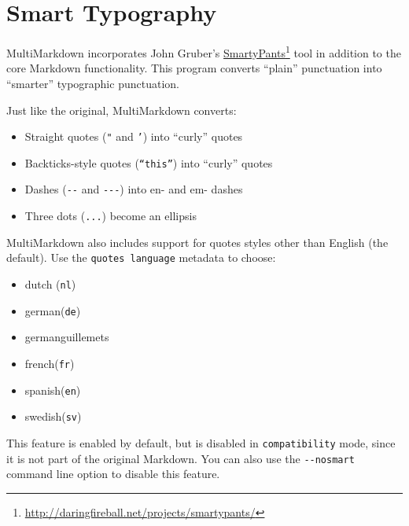 \section{Smart Typography }
\label{smarttypography}

MultiMarkdown incorporates John Gruber's \href{http://daringfireball.net/projects/smartypants/}{SmartyPants}\footnote{\href{http://daringfireball.net/projects/smartypants/}{http:\slash \slash daringfireball.net\slash projects\slash smartypants\slash }} tool in addition to the core Markdown functionality. This program converts ``plain'' punctuation into ``smarter'' typographic punctuation.

Just like the original, MultiMarkdown converts:

\begin{itemize}
\item Straight quotes (\texttt{"} and \texttt{'}) into ``curly'' quotes

\item Backticks-style quotes (\texttt{``this''}) into ``curly'' quotes

\item Dashes (\texttt{-{}-} and \texttt{-{}-{}-}) into en- and em- dashes

\item Three dots (\texttt{...}) become an ellipsis

\end{itemize}

MultiMarkdown also includes support for quotes styles other than English (the default). Use the \texttt{quotes language} metadata to choose:

\begin{itemize}
\item dutch (\texttt{nl})

\item german(\texttt{de})

\item germanguillemets

\item french(\texttt{fr})

\item spanish(\texttt{en})

\item swedish(\texttt{sv})

\end{itemize}

This feature is enabled by default, but is disabled in \texttt{compatibility} mode, since it is not part of the original Markdown. You can also use the \texttt{-{}-nosmart} command line option to disable this feature.

